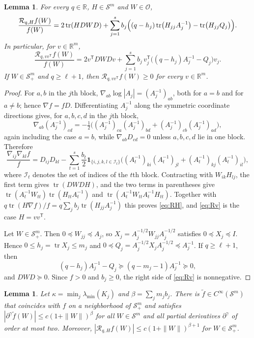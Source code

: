 \documentclass{amsart}
\newtheorem{lemma}[theorem]{Lemma}
\theoremstyle{definition}
\theoremstyle{remark}
\numberwithin{equation}{section}
\newcommand{\R}{\mathbb{R}}
\newcommand{\Sym}{\mathcal{S}}
\newcommand{\Rop}{\mathcal{R}}
\newcommand{\tr}{\operatorname{tr}}
\begin{document}
\begin{lemma}\label{lem:operator}
For every $q\in\R$, $H\in\Sym^m$ and $W\in\mathcal O$,
\begin{equation}\label{eq:RH}
\frac{\Rop_{q,H}f(W)}{f(W)}=2\tr(HDWD)+\sum_{j=1}^sb_j\Bigl((q-h_j)\tr\bigl(H_{jj}A_j^{-1}\bigr)-\tr\bigl(H_{jj}Q_j\bigr)\Bigr).
\end{equation}
In particular, for $v\in\R^m$,
\begin{equation}\label{eq:Rv}
\frac{\Rop_{q,vv^{\mathsf T}}f(W)}{f(W)}=2v^{\mathsf T}DWDv+\sum_{j=1}^sb_j\,v_j^{\mathsf T}\bigl((q-h_j)A_j^{-1}-Q_j\bigr)v_j .
\end{equation}
If $W\in\Sym^m_+$ and $q\ge\ell+1$, then $\Rop_{q,vv^{\mathsf T}}f(W)\ge0$ for every $v\in\R^m$.
\end{lemma}

\begin{proof}
For $a,b$ in the $j$th block, $\nabla_{ab}\log|A_j|=(A_j^{-1})_{ab}$, both for $a=b$ and for $a\neq b$; hence $\nabla f=fD$. Differentiating $A_j^{-1}$ along the symmetric coordinate directions gives, for $a,b,c,d$ in the $j$th block,
\[
\nabla_{ab}(A_j^{-1})_{cd}=-\tfrac12\bigl((A_j^{-1})_{ca}(A_j^{-1})_{bd}+(A_j^{-1})_{cb}(A_j^{-1})_{ad}\bigr),
\]
again including the case $a=b$, while $\nabla_{ab}D_{cd}=0$ unless $a,b,c,d$ lie in one block. Therefore
\[
\frac{\nabla_{ij}\nabla_{kl}f}{f}=D_{ij}D_{kl}-\sum_{t=1}^s\frac{b_t}{2}\mathbf 1_{\{i,j,k,l\in\mathcal I_t\}}\bigl((A_t^{-1})_{ki}(A_t^{-1})_{jl}+(A_t^{-1})_{kj}(A_t^{-1})_{il}\bigr),
\]
where $\mathcal I_t$ denotes the set of indices of the $t$th block. Contracting with $W_{ik}H_{lj}$, the first term gives $\tr(DWDH)$, and the two terms in parentheses give $\tr(A_t^{-1}W_{tt})\tr(H_{tt}A_t^{-1})$ and $\tr(A_t^{-1}W_{tt}A_t^{-1}H_{tt})$. Together with $q\tr(H\nabla f)/f=q\sum_jb_j\tr(H_{jj}A_j^{-1})$ this proves \eqref{eq:RH}, and \eqref{eq:Rv} is the case $H=vv^{\mathsf T}$.

Let $W\in\Sym^m_+$. Then $0\preceq W_{jj}\preceq A_j$, so $X_j=A_j^{-1/2}W_{jj}A_j^{-1/2}$ satisfies $0\preceq X_j\preceq I$. Hence $0\le h_j=\tr X_j\le m_j$ and $0\preceq Q_j=A_j^{-1/2}X_jA_j^{-1/2}\preceq A_j^{-1}$. If $q\ge\ell+1$, then
\[
(q-h_j)A_j^{-1}-Q_j\succeq(q-m_j-1)A_j^{-1}\succeq0,
\]
and $DWD\succeq0$. Since $f>0$ and $b_j\ge0$, the right side of \eqref{eq:Rv} is nonnegative.
\end{proof}

\begin{lemma}\label{lem:extension}
Let $\kappa=\min_j\lambda_{\min}(K_j)$ and $\beta=\sum_jm_jb_j$. There is $\tilde f\in C^\infty(\Sym^m)$ that coincides with $f$ on a neighborhood of $\Sym^m_+$ and satisfies $|\partial^\gamma\tilde f(W)|\le c(1+\|W\|)^\beta$ for all $W\in\Sym^m$ and all partial derivatives $\partial^\gamma$ of order at most two. Moreover, $|\Rop_{q,H}f(W)|\le c(1+\|W\|)^{\beta+1}$ for $W\in\Sym^m_+$.
\end{lemma}
\end{document}
